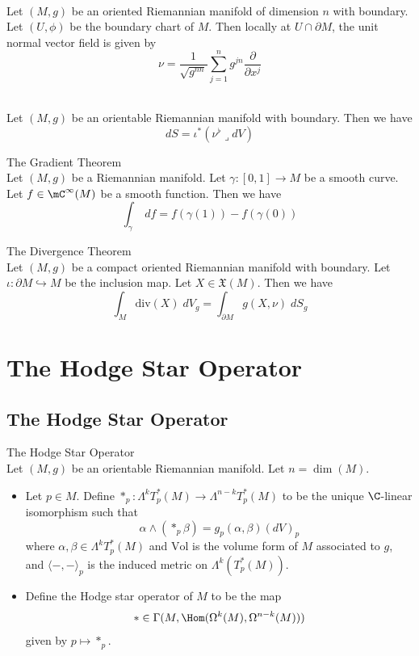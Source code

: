 \documentclass[a4paper]{article}
\begin{document}
\begin{lmm}{}{}\\
Let $(M,g)$ be an oriented Riemannian manifold of dimension $n$ with boundary. Let $(U,\phi)$ be the boundary chart of $M$. Then locally at $U\cap\partial M$, the unit normal vector field is given by $$\nu=\frac{1}{\sqrt{g^{nn}}}\sum_{j=1}^ng^{jn}\frac{\partial}{\partial x^j}$$
\end{lmm}

\begin{lmm}{}{}\\
Let $(M,g)$ be an orientable Riemannian manifold with boundary. Then we have $$dS=\iota^\ast(\nu^\flat\lrcorner dV)$$
\end{lmm}

\begin{thm}{The Gradient Theorem}{}\\
Let $(M,g)$ be a Riemannian manifold. Let $\gamma:[0,1]\to M$ be a smooth curve. Let $f\in\mC^\infty(M)$ be a smooth function. Then we have $$\int_\gamma\;df=f(\gamma(1))-f(\gamma(0))$$
\end{thm}

\begin{thm}{The Divergence Theorem}{}\\
Let $(M,g)$ be a compact oriented Riemannian manifold with boundary. Let $\iota:\partial M\hookrightarrow M$ be the inclusion map. Let $X\in\mathfrak{X}(M)$. Then we have $$\int_M\text{div}(X)\;dV_g=\int_{\partial M}g(X,\nu)\;dS_g$$
\end{thm}

\pagebreak
\section{The Hodge Star Operator}
\subsection{The Hodge Star Operator}
\begin{defn}{The Hodge Star Operator}{}\\
Let $(M,g)$ be an orientable Riemannian manifold. Let $n=\dim(M)$. 
\begin{itemize}
\item Let $p\in M$. Define $\ast_p:\Lambda^kT_p^\ast(M)\to\Lambda^{n-k}T_p^\ast(M)$ to be the unique $\C$-linear isomorphism such that $$\alpha\wedge(\ast_p\beta)=g_p(\alpha,\beta)(dV)_p$$ where $\alpha,\beta\in\Lambda^kT_p^\ast(M)$ and $\text{Vol}$ is the volume form of $M$ associated to $g$, and $\langle-,-\rangle_p$ is the induced metric on $\Lambda^k(T_p^\ast(M))$. 
\item Define the Hodge star operator of $M$ to be the map $$\ast\in\Gamma(M,\Hom(\Omega^k(M),\Omega^{n-k}(M)))$$ given by $p\mapsto\ast_p$. 
\end{itemize}
\end{defn}
\end{document}

